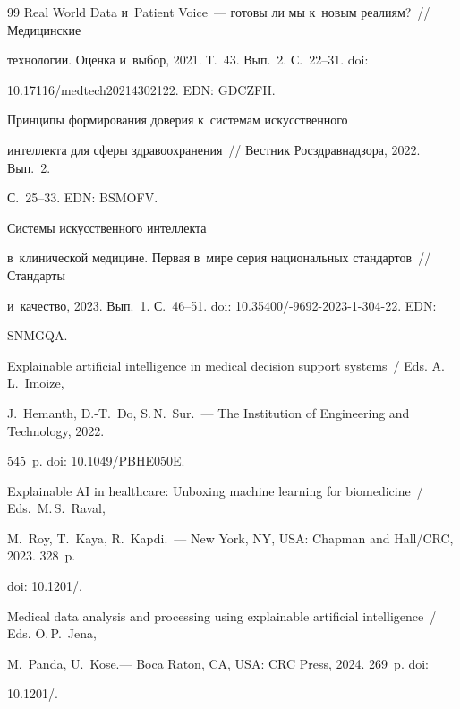 {{\begin{thebibliography}{99}
Real World Data и~Patient Voice~--- готовы ли мы к~новым реалиям?~/\!\!/ Медицинские 

технологии. Оценка и~выбор, 2021. Т.~43. Вып.~2. С.~22--31. doi: 

10.17116\!/\!medtech20214302122. EDN: GDCZFH.




    Принципы формирования доверия к~системам искусственного 

интеллекта для сферы здравоохранения~/\!\!/ Вестник Росздравнадзора, 2022. Вып.~2.  

С.~25--33.  EDN: BSMOFV.




    Системы искусственного интеллекта 

в~клинической медицине. Первая в~мире серия национальных стандартов~/\!\!/ Стандарты 

и~качество, 2023. Вып.~1. С.~46--51. doi: 10.35400\!/-9692-2023-1-304-22. EDN: 

SNMGQA.




Explainable artificial intelligence in medical decision support systems~/ Eds. A.\,L.~Imoize, 

J.~Hemanth, D.-T.~Do, S.\,N.~Sur.~--- The Institution of Engineering and Technology, 2022. 

545~p. doi: 10.1049\!/\!PBHE050E. 


Explainable AI in healthcare: Unboxing machine learning for biomedicine~/ Eds.\ M.\,S.~Raval, 

M.~Roy, T.~Kaya, R.~Kapdi.~--- New York, NY, USA: Chapman and Hall\!/\!CRC, 2023. 328~p. 

doi: 10.1201\!/.


Medical data analysis and processing using explainable artificial intelligence~/ Eds. O.\,P.~Jena, 

M.~Panda, U.~Kose.--- Boca Raton, CA, USA: CRC Press, 2024. 269~p. doi: 

10.1201\!/.





\end{thebibliography}}}
